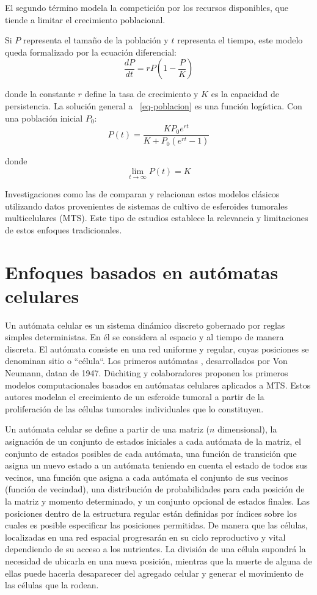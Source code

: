El segundo término modela la competición por los recursos disponibles, que tiende a limitar el crecimiento poblacional.

Si $P$ representa el tamaño de la población y $t$ representa el tiempo, este modelo queda formalizado por la ecuación diferencial:
\begin{equation}
   \frac{dP}{dt} = rP(1 - \frac{P}{K})\label{eq-poblacion}
\end{equation}

donde la constante $r$ define la tasa de crecimiento y $K$ es la capacidad de persistencia. La soluci\'on general a ~\ref{eq-poblacion} es una funci\'on logística. Con una poblaci\'on inicial $P_{0}$:
\begin{equation}
    P(t) = \frac{KP_{0}e^{rt}}{K + P_{0}(e^{rt} - 1)}
 \end{equation}

donde 
\begin{equation}
    \lim_{t \to \infty} P(t) = K
\end{equation}

Investigaciones como las de \cite{book} comparan y relacionan estos modelos clásicos utilizando datos provenientes de sistemas de cultivo de esferoides tumorales multicelulares (MTS). Este tipo de estudios establece la relevancia y limitaciones de estos enfoques tradicionales.

\section{Enfoques basados en autómatas celulares}
Un autómata celular es un sistema dinámico discreto gobernado por reglas simples deterministas. En él se considera al espacio y al tiempo de manera discreta. El autómata consiste en una red uniforme y regular, cuyas posiciones se denominan sitio o ``célula``. Los primeros autómatas \cite{viabarre2019}, desarrollados por Von Neumann, datan de 1947. D\"uchiting y colaboradores proponen los primeros modelos computacionales basados en autómatas celulares aplicados a MTS. Estos autores modelan el crecimiento de un esferoide tumoral a partir de la proliferación de las células tumorales individuales que lo constituyen.

Un autómata celular se define a partir de una matriz ($n$ dimensional), la asignación de un conjunto de estados iniciales a cada autómata de la matriz, el conjunto de estados posibles de cada autómata, una función de transición que asigna un nuevo estado a un autómata teniendo en cuenta el estado de todos sus vecinos, una función que asigna a cada autómata el conjunto de sus vecinos (función de vecindad), una distribución de probabilidades para cada posición de la matriz y momento determinado, y un conjunto opcional de estados finales. Las posiciones dentro de la estructura regular están definidas por índices sobre los cuales es posible especificar las posiciones permitidas. De manera que las células, localizadas en una red espacial progresarán en su ciclo reproductivo y vital dependiendo de su acceso a los nutrientes. La división de una célula supondrá la necesidad de ubicarla en una nueva posición, mientras que la muerte de alguna de ellas puede hacerla desaparecer del agregado celular y generar el movimiento de las células que la rodean.

